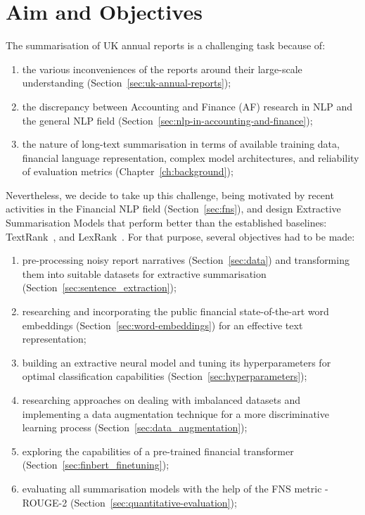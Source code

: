 \section{Aim and Objectives}\label{sec:aim-and-objectives}
The summarisation of UK annual reports is a challenging task because of:
 \begin{enumerate}
     \item the various inconveniences of the reports around their large-scale understanding (Section~\ref{sec:uk-annual-reports});
     \item the discrepancy between Accounting and Finance (AF) research in NLP and the general NLP field (Section~\ref{sec:nlp-in-accounting-and-finance});
     \item the nature of long-text summarisation in terms of available training data, financial language representation, complex model architectures, and reliability of evaluation metrics (Chapter~\ref{ch:background});
 \end{enumerate}
 Nevertheless, we decide to take up this challenge, being motivated by recent activities in the Financial NLP field
(Section~\ref{sec:fns}), and design Extractive Summarisation Models that perform better than the established baselines: TextRank~\cite{mihalcea-tarau-2004-textrank}, and LexRank~\cite{Erkan2004LexRankGC}.
 For that purpose, several objectives had to be made:
 \begin{enumerate}
     \item pre-processing noisy report narratives (Section~\ref{sec:data}) and transforming them into suitable datasets for extractive summarisation (Section~\ref{sec:sentence_extraction});
     \item researching and incorporating the public financial state-of-the-art word embeddings (Section~\ref{sec:word-embeddings}) for an effective text representation;
     \item building an extractive neural model and tuning its hyperparameters for optimal classification capabilities (Section~\ref{sec:hyperparameters});
     \item researching approaches on dealing with imbalanced datasets and implementing a data augmentation technique for a more discriminative learning process (Section~\ref{sec:data_augmentation});
     \item exploring the capabilities of a pre-trained financial transformer (Section~\ref{sec:finbert_finetuning});
     \item evaluating all summarisation models with the help of the FNS metric - ROUGE-2 (Section~\ref{sec:quantitative-evaluation});
 \end{enumerate}